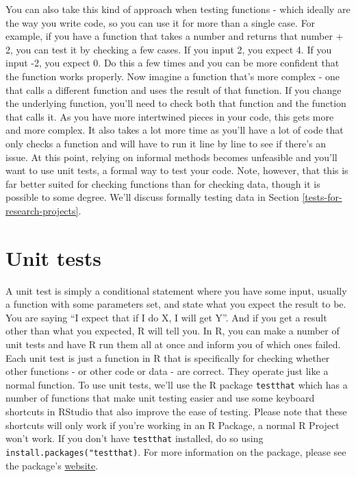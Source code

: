 \documentclass[
  12pt,
]{book}
\begin{document}
You can also take this kind of approach when testing functions - which ideally are the way you write code, so you can use it for more than a single case. For example, if you have a function that takes a number and returns that number + 2, you can test it by checking a few cases. If you input 2, you expect 4. If you input -2, you expect 0. Do this a few times and you can be more confident that the function works properly. Now imagine a function that's more complex - one that calls a different function and uses the result of that function. If you change the underlying function, you'll need to check both that function and the function that calls it. As you have more intertwined pieces in your code, this gets more and more complex. It also takes a lot more time as you'll have a lot of code that only checks a function and will have to run it line by line to see if there's an issue. At this point, relying on informal methods becomes unfeasible and you'll want to use unit tests, a formal way to test your code. Note, however, that this is far better suited for checking functions than for checking data, though it is possible to some degree. We'll discuss formally testing data in Section \ref{tests-for-research-projects}.

\hypertarget{unit-tests}{%
\section{Unit tests}\label{unit-tests}}

A unit test is simply a conditional statement where you have some input, usually a function with some parameters set, and state what you expect the result to be. You are saying ``I expect that if I do X, I will get Y''. And if you get a result other than what you expected, R will tell you. In R, you can make a number of unit tests and have R run them all at once and inform you of which ones failed. Each unit test is just a function in R that is specifically for checking whether other functions - or other code or data - are correct. They operate just like a normal function. To use unit tests, we'll use the R package \texttt{testthat} which has a number of functions that make unit testing easier and use some keyboard shortcuts in RStudio that also improve the ease of testing. Please note that these shortcuts will only work if you're working in an R Package, a normal R Project won't work. If you don't have \texttt{testthat} installed, do so using \texttt{install.packages("testthat)}. For more information on the package, please see the package's \href{https://testthat.r-lib.org/index.html}{website}.
\end{document}
